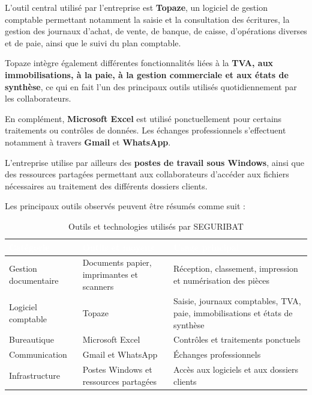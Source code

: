 \documentclass[12pt,a4paper,oneside]{report}
\newcommand{\TableSetup}{%
  \arrayrulecolor{ComptaTableLine}%
  \setlength{\arrayrulewidth}{0.45pt}%
  \renewcommand{\arraystretch}{1.18}%
}
\newcommand{\TableHead}[1]{\textcolor{white}{\textbf{#1}}}
\begin{document}
L'outil central utilisé par l'entreprise est \textbf{Topaze}, un logiciel de gestion comptable permettant notamment la saisie et la consultation des écritures, la gestion des journaux d'achat, de vente, de banque, de caisse, d'opérations diverses et de paie, ainsi que le suivi du plan comptable.

Topaze intègre également différentes fonctionnalités liées à la \textbf{TVA, aux immobilisations, à la paie, à la gestion commerciale et aux états de synthèse}, ce qui en fait l'un des principaux outils utilisés quotidiennement par les collaborateurs.

En complément, \textbf{Microsoft Excel} est utilisé ponctuellement pour certains traitements ou contrôles de données. Les échanges professionnels s'effectuent notamment à travers \textbf{Gmail} et \textbf{WhatsApp}.

L'entreprise utilise par ailleurs des \textbf{postes de travail sous Windows}, ainsi que des ressources partagées permettant aux collaborateurs d'accéder aux fichiers nécessaires au traitement des différents dossiers clients.

Les principaux outils observés peuvent être résumés comme suit :

\begin{table}[H]
\centering
\caption{Outils et technologies utilisés par SEGURIBAT}
\label{tab:technologies-seguribat}
\TableSetup
\begin{tabularx}{\textwidth}{|L{3.2cm}|L{4.2cm}|Y|}
\toprule
{}\TableHead{Catégorie} & \TableHead{Outils et moyens} & \TableHead{Usage principal} \\
\midrule
Gestion documentaire & Documents papier, imprimantes et scanners & Réception, classement, impression et numérisation des pièces \\
Logiciel comptable & Topaze & Saisie, journaux comptables, TVA, paie, immobilisations et états de synthèse \\
Bureautique & Microsoft Excel & Contrôles et traitements ponctuels \\
Communication & Gmail et WhatsApp & Échanges professionnels \\
Infrastructure & Postes Windows et ressources partagées & Accès aux logiciels et aux dossiers clients \\
\bottomrule
\end{tabularx}
\end{table}

\end{document}

